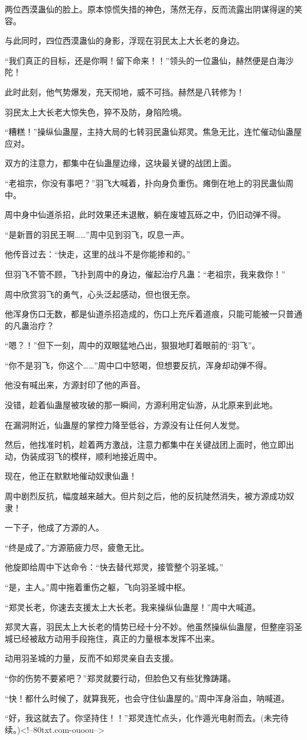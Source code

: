 \begin{this_body}
两位西漠蛊仙的脸上。原本惊慌失措的神色，荡然无存，反而流露出阴谋得逞的笑容。

与此同时，四位西漠蛊仙的身影，浮现在羽民太上大长老的身边。

“我们真正的目标，还是你啊！留下命来！！”领头的一位蛊仙，赫然便是白海沙陀！

此时此刻，他气势爆发，充天彻地，威不可挡。赫然是八转修为！

羽民太上大长老大惊失色，猝不及防，身陷险境。

“糟糕！”操纵仙蛊屋，主持大局的七转羽民蛊仙郑灵。焦急无比，连忙催动仙蛊屋应对。

双方的注意力，都集中在仙蛊屋边缘，这块最关键的战团上面。

“老祖宗，你没有事吧？”羽飞大喊着，扑向身负重伤。瘫倒在地上的羽民蛊仙周中。

周中身中仙道杀招，此时效果还未退散，躺在废墟瓦砾之中，仍旧动弹不得。

“是新晋的羽民王啊……”周中见到羽飞，叹息一声。

他传音过去：“快走，这里的战斗不是你能掺和的。”

但羽飞不管不顾，飞扑到周中的身边，催起治疗凡蛊：“老祖宗，我来救你！”

周中欣赏羽飞的勇气，心头泛起感动，但也很无奈。

他浑身伤口无数，都是仙道杀招造成的，伤口上充斥着道痕，只能可能被一只普通的凡蛊治疗？

“嗯？！”但下一刻，周中的双眼猛地凸出，狠狠地盯着眼前的“羽飞”。

“你不是羽飞，你这个……”周中口中怒喝，但想要反抗，浑身却动弹不得。

他没有喊出来，方源封印了他的声音。

没错，趁着仙蛊屋被攻破的那一瞬间，方源利用定仙游，从北原来到此地。

在漏洞附近，仙蛊屋的掌控力降至低谷，方源没有让任何人发觉。

然后，他找准时机，趁着两方激战，注意力都集中在关键战团上面时，他立即出动，伪装成羽飞的模样，顺利地接近周中。

现在，他正在默默地催动奴隶仙蛊！

周中剧烈反抗，幅度越来越大。但片刻之后，他的反抗陡然消失，被方源成功奴隶！

一下子，他成了方源的人。

“终是成了。”方源筋疲力尽，疲惫无比。

他旋即给周中下达命令：“快去替代郑灵，接管整个羽圣城。”

“是，主人。”周中拖着重伤之躯，飞向羽圣城中枢。

“郑灵长老，你速去支援太上大长老。我来操纵仙蛊屋！”周中大喊道。

郑灵大喜，羽民太上大长老的情势已经十分不妙。他虽然操纵仙蛊屋，但整座羽圣城已经被敌方动用手段拖住，真正的力量根本发挥不出来。

动用羽圣城的力量，反而不如郑灵亲自去支援。

“你的伤势不要紧吧？”郑灵就要行动，但脸色又有些犹豫踌躇。

“快！都什么时候了，就算我死，也会守住仙蛊屋的。”周中浑身浴血，呐喊道。

“好，我这就去了。你坚持住！！”郑灵连忙点头，化作遁光电射而去。(未完待续。)<!--80txt.com-ouoou-->

\end{this_body}

